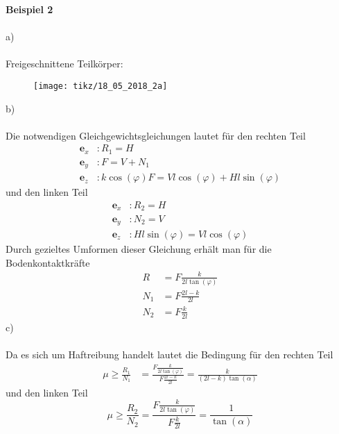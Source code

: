\textbf{Beispiel 2}\\ \\
a)\\ \\
Freigeschnittene Teilkörper:
\begin{figure}[h]
	\centering
	\texttt{[image: tikz/18\_05\_2018\_2a]}
\end{figure}
\newpage
\noindent
b)\\ \\
Die notwendigen Gleichgewichtsgleichungen lautet für den rechten Teil 
\begin{align}
	\textbf{e}_x &: R_1 = H\\
	\textbf{e}_y &: F = V + N_1\\
	\textbf{e}_z &: k\cos(\varphi)F = Vl\cos(\varphi) + Hl\sin(\varphi)
\end{align}
und den linken Teil
\begin{align*}
	\textbf{e}_x &: R_2 = H\\
	\textbf{e}_y &: N_2 = V\\
	\textbf{e}_z &: Hl\sin(\varphi) = Vl\cos(\varphi)
\end{align*}
Durch gezieltes Umformen dieser Gleichung erhält man für die Bodenkontaktkräfte
\begin{align*}
	R &= F\frac{k}{2l\tan(\varphi)} \\
	N_1 &= F\frac{2l - k}{2l} \\
	N_2 &= F\frac{k}{2l}
\end{align*}
c)\\ \\
Da es sich um Haftreibung handelt lautet die Bedingung für den rechten Teil
\begin{align*}
	\mu \geq \frac{R_1}{N_1} &= \frac{F\frac{k}{2l\tan(\varphi)}}{F\frac{2l - k}{2l}} = \frac{k}{(2l - k)\tan(\alpha)}
\end{align*}
und den linken Teil
\[
	\mu \geq \frac{R_2}{N_2} = \frac{F\frac{k}{2l\tan(\varphi)}}{F\frac{k}{2l}} = \frac{1}{\tan(\alpha)}
\]